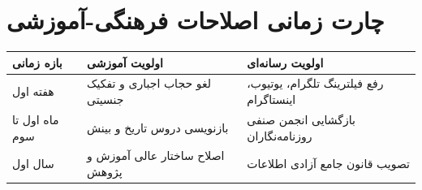 \section{چارت زمانی اصلاحات فرهنگی-آموزشی}

\begin{center}
\begin{tabular}{R{4cm} R{5cm} R{6cm}}
\hline
\textbf{بازه زمانی} & \textbf{اولویت آموزشی} & \textbf{اولویت رسانه‌ای} \\
\hline
هفته اول & لغو حجاب اجباری و تفکیک جنسیتی & رفع فیلترینگ تلگرام، یوتیوب، اینستاگرام \\
ماه اول تا سوم & بازنویسی دروس تاریخ و بینش & بازگشایی انجمن صنفی روزنامه‌نگاران \\
سال اول & اصلاح ساختار عالی آموزش و پژوهش & تصویب قانون جامع آزادی اطلاعات \\
\hline
\end{tabular}
\end{center}
